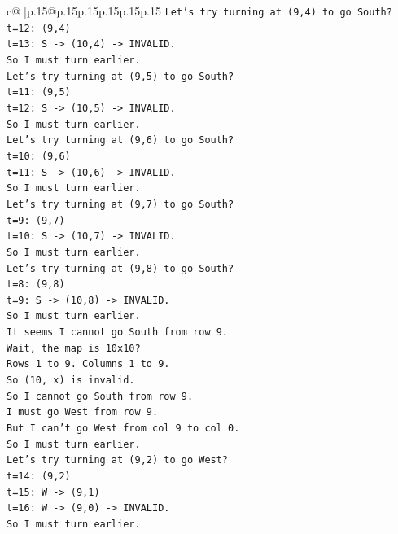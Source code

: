\documentclass{article}
\begin{document}
{\begin{supertabular}{c@{$\;$}|p{.15\linewidth}@{}p{.15\linewidth}p{.15\linewidth}p{.15\linewidth}p{.15\linewidth}p{.15\linewidth}}
{{{\texttt{Let's try turning at (9,4) to go South?} \\
\texttt{t=12: (9,4)} \\
\texttt{t=13: S {-}> (10,4) {-}> INVALID.} \\
\texttt{So I must turn earlier.} \\
\texttt{Let's try turning at (9,5) to go South?} \\
\texttt{t=11: (9,5)} \\
\texttt{t=12: S {-}> (10,5) {-}> INVALID.} \\
\texttt{So I must turn earlier.} \\
\texttt{Let's try turning at (9,6) to go South?} \\
\texttt{t=10: (9,6)} \\
\texttt{t=11: S {-}> (10,6) {-}> INVALID.} \\
\texttt{So I must turn earlier.} \\
\texttt{Let's try turning at (9,7) to go South?} \\
\texttt{t=9: (9,7)} \\
\texttt{t=10: S {-}> (10,7) {-}> INVALID.} \\
\texttt{So I must turn earlier.} \\
\texttt{Let's try turning at (9,8) to go South?} \\
\texttt{t=8: (9,8)} \\
\texttt{t=9: S {-}> (10,8) {-}> INVALID.} \\
\texttt{So I must turn earlier.} \\
\texttt{It seems I cannot go South from row 9.} \\
\texttt{Wait, the map is 10x10?} \\
\texttt{Rows 1 to 9. Columns 1 to 9.} \\
\texttt{So (10, x) is invalid.} \\
\texttt{So I cannot go South from row 9.} \\
\texttt{I must go West from row 9.} \\
\texttt{But I can't go West from col 9 to col 0.} \\
\texttt{So I must turn earlier.} \\
\texttt{Let's try turning at (9,2) to go West?} \\
\texttt{t=14: (9,2)} \\
\texttt{t=15: W {-}> (9,1)} \\
\texttt{t=16: W {-}> (9,0) {-}> INVALID.} \\
\texttt{So I must turn earlier.} \\
}}}
\end{supertabular}}
\end{document}
